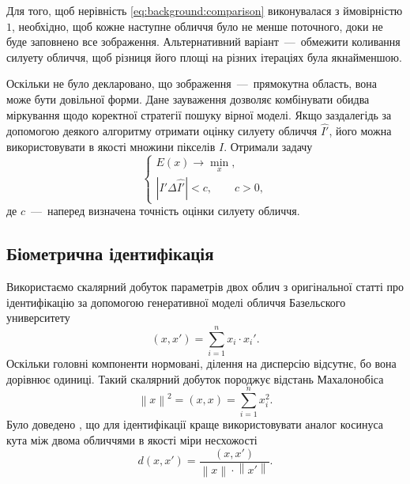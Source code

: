 Для того, щоб нерівність \eqref{eq:background:comparison}
виконувалася з ймовірністю $1$,
необхідно, щоб кожне наступне обличчя було не менше поточного,
доки не буде заповнено все зображення.
Альтернативний варіант~---~обмежити коливання силуету обличчя,
щоб різниця його площі на різних ітераціях була якнайменшою.

Оскільки не було декларовано, що зображення~---~прямокутна область,
вона може бути довільної форми.
Дане зауваження дозволяє комбінувати обидва міркування
щодо коректної стратегії пошуку вірної моделі.
Якщо заздалегідь за допомогою деякого алгоритму отримати
оцінку силуету обличчя $\hat{I'}$,
його можна використовувати в якості множини пікселів $I$.
Отримали задачу
\begin{equation*}
  \begin{cases}
    E\left( x \right) \to \min\limits_x, \\
    \left| I' \Delta \hat{I'} \right| < c, \qquad c > 0,
  \end{cases}
\end{equation*}
де $c$~---~наперед визначена точність оцінки силуету обличчя.

\subsection{Біометрична ідентифікація}

Використаємо скалярний добуток параметрів двох облич
з оригінальної статті про ідентифікацію за допомогою генеративної моделі обличчя
Базельского университету \cite{blanz:romdhani:vetter}
\begin{equation*}
  \left( x, x' \right) = \sum_{i=1}^n x_i \cdot x_i'.
\end{equation*}
Оскільки головні компоненти нормовані, ділення на дисперсію відсутнє,
бо вона дорівнює одиниці.
Такий скалярний добуток породжує відстань Махалонобіса \cite{Haykin:1998}
\begin{equation*}
  \left\| x \right\|^2 = \left( x, x \right) = \sum_{i=1}^n x_i^2.
\end{equation*}
Було доведено \cite{Moon:2017},
що для ідентифікації краще використовувати аналог косинуса кута
між двома обличчями в якості міри несхожості
\begin{equation*}
  d\left( x, x' \right)
  = \frac{\left( x, x' \right)}{\left\| x \right\| \cdot \left\| x' \right\|}.
\end{equation*}
